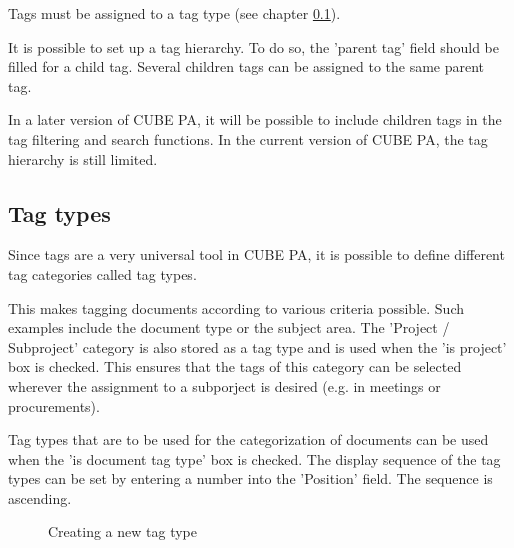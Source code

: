 Tags must be assigned to a tag type (see chapter \ref{bkm:Ref444100222}).

\vspace{\baselineskip}

It is possible to set up a tag hierarchy. To do so, the 'parent tag' field should be filled for a child tag. Several children tags can be assigned to the same parent tag.

\vspace{\baselineskip}

In a later version of CUBE PA, it will be possible to include children tags in the tag filtering and search functions. In the current version of CUBE PA, the tag hierarchy is still limited.

\subsection{Tag types}
\label{bkm:Ref444100222}
Since tags are a very universal tool in CUBE PA, it is possible to define different tag categories called tag types.
\newline

This makes tagging documents according to various criteria possible. Such examples include the document type or the subject area. The 'Project / Subproject' category is also stored as a tag type and is used when the 'is project' box is checked. This ensures that the tags of this category can be selected wherever the assignment to a subporject is desired (e.g. in meetings or procurements). \newline

Tag types that are to be used for the categorization of documents can be used when the 'is document tag type' box is checked. The display sequence of the tag types can be set by entering a number into the 'Position' field. The sequence is ascending.

\begin{figure}[H]
\caption{Creating a new tag type}
\end{figure}

